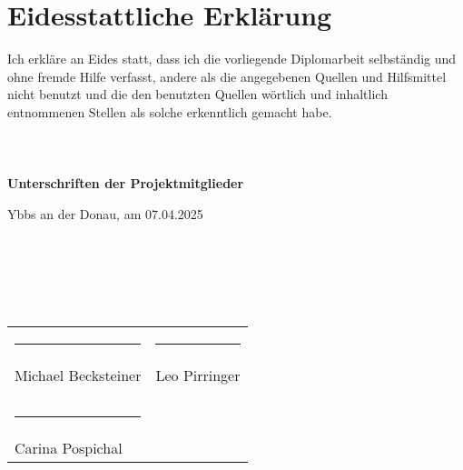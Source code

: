 \chapter*{Eidesstattliche Erklärung} 

Ich erkläre an Eides statt, dass ich die vorliegende Diplomarbeit selbständig und ohne fremde Hilfe verfasst, 
andere als die angegebenen Quellen und Hilfsmittel nicht benutzt und die den benutzten Quellen wörtlich und inhaltlich entnommenen Stellen 
als solche erkenntlich gemacht habe.
\\\\\\\\

\textbf{Unterschriften der Projektmitglieder}

Ybbs an der Donau, am 07.04.2025
\\\\\\\\\\\\

\begin{table}[ht]
  \begin{tabular}{p{8cm} p{8cm}}
    \rule{6cm}{0.01cm} & \rule{6cm}{0.01cm}\\
    Michael Becksteiner & Leo Pirringer\\
    \\
    \\
    \rule{6cm}{0.01cm}\\
    Carina Pospichal
  \end{tabular}
\end{table}